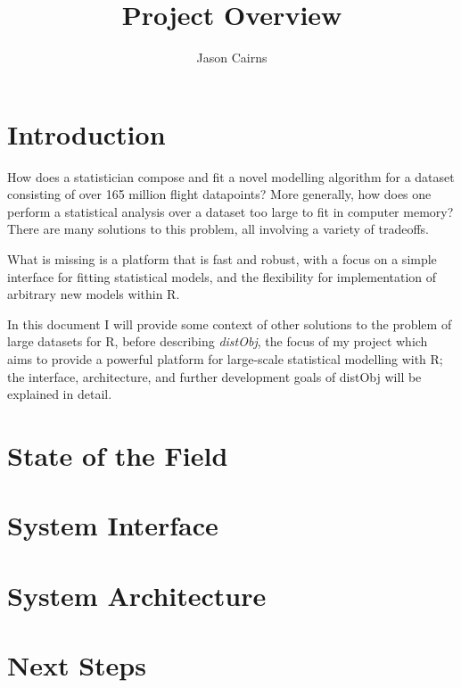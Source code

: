 \documentclass[a4paper,10pt]{article}
\begin{document}
\title{Project Overview}
\author{Jason Cairns}
  
\maketitle{}

\section{Introduction}
How does a statistician compose and fit a novel modelling algorithm for a
dataset consisting of over 165 million flight datapoints?
More generally, how does one perform a statistical analysis over a dataset too
large to fit in computer memory?
There are many solutions to this problem, all involving a variety of tradeoffs.

What is missing is a platform that is fast and robust, with a focus on a simple
interface for fitting statistical models, and the flexibility for
implementation of arbitrary new models within R.

In this document I will provide some context of other solutions to the problem
of large datasets for R, before describing \textit{distObj}, the focus of my
project which aims to provide a powerful platform for large-scale statistical
modelling with R; the interface, architecture, and further development goals of
distObj will be explained in detail.

\section{State of the Field}
\section{System Interface}
\section{System Architecture}
\section{Next Steps}
\end{document}
